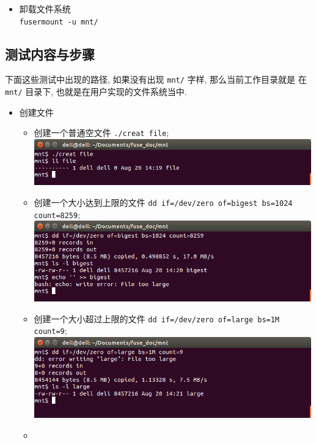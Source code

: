 \documentclass[nofonts]{ctexart}
\begin{document}
\begin{itemize}
\item
  卸载文件系统\\ \texttt{fusermount -u mnt/}
\end{itemize}

\subsection{测试内容与步骤}\label{ux6d4bux8bd5ux5185ux5bb9ux4e0eux6b65ux9aa4}

下面这些测试中出现的路径, 如果没有出现 \texttt{mnt/} 字样,
那么当前工作目录就是 在 \texttt{mnt/} 目录下,
也就是在用户实现的文件系统当中.

\begin{itemize}
\item
  创建文件
\begin{itemize}
\item
  创建一个普通空文件 \texttt{./creat file};\\
  \includegraphics[width=12cm]{./images/./creat_t1.png}
\item
  创建一个大小达到上限的文件
  \texttt{dd if=/dev/zero of=bigest bs=1024 count=8259};\\
  \includegraphics[width=12cm]{./images/./creat_t2.png}
\item
  创建一个大小超过上限的文件
  \texttt{dd if=/dev/zero of=large bs=1M count=9};\\
  \includegraphics[width=12cm]{./images/./creat_t3.png}
\item

\end{itemize}
\end{itemize}
\end{document}

